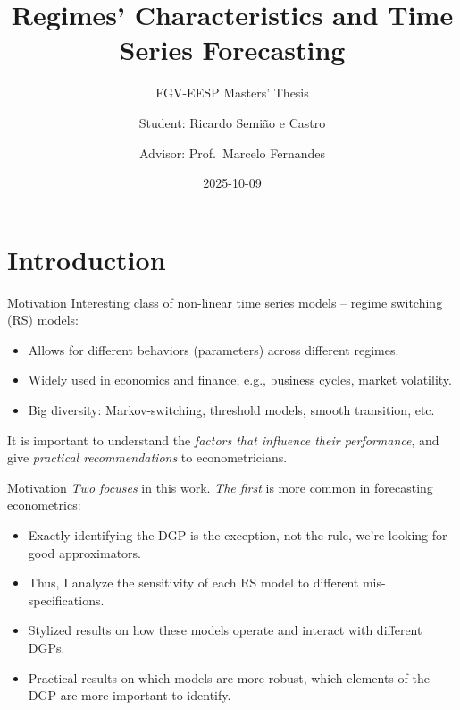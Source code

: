 \documentclass[
  ignorenonframetext,
]{beamer}
\title{Regimes' Characteristics and Time Series Forecasting}
\subtitle{FGV-EESP Masters' Thesis}
\author{Student: Ricardo Semião e Castro \and Advisor: Prof.~Marcelo
Fernandes}
\date{2025-10-09}
\providecommand{\tightlist}{%
  \setlength{\itemsep}{0pt}\setlength{\parskip}{0pt}}\usepackage{longtable,booktabs,array}
\begin{document}
\frame{\titlepage}


\section{Introduction}\label{introduction}

\begin{frame}{Motivation}
\label{motivation}
Interesting class of non-linear time series models -- regime switching
(RS) models:

\begin{itemize}
\tightlist
\item
  Allows for different behaviors (parameters) across different regimes.
\item
  Widely used in economics and finance, e.g., business cycles, market
  volatility.
\item
  Big diversity: Markov-switching, threshold models, smooth transition,
  etc.
\end{itemize}

It is important to understand the \emph{factors that influence their
performance}, and give \emph{practical recommendations} to
econometricians.
\end{frame}

\begin{frame}{Motivation}
\label{motivation-1}
\emph{Two focuses} in this work. \emph{The first} is more common in
forecasting econometrics:

\begin{itemize}
\tightlist
\item
  Exactly identifying the DGP is the exception, not the rule, we're
  looking for good approximators.
\item
  Thus, I analyze the sensitivity of each RS model to different
  mis-specifications.
\item
  Stylized results on how these models operate and interact with
  different DGPs.
\item
  Practical results on which models are more robust, which elements of
  the DGP are more important to identify.
\end{itemize}
\end{frame}
\end{document}
